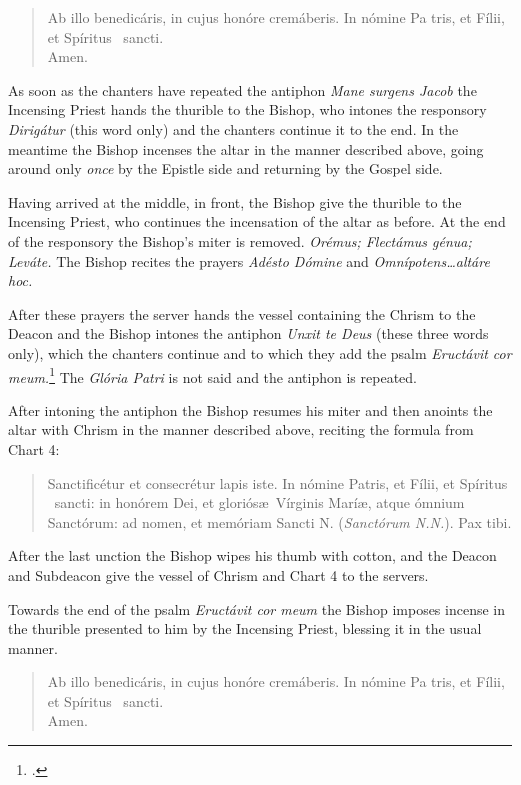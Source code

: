 \documentclass[letterpaper]{report}
\newcommand\blessincense{
\begin{quote}
   Ab illo benedicáris, in cujus honóre cremáberis. In nómine Pa\cross
    tris, et Fí\cross lii, et Spíritus \cross\ sancti. \\ \rbar Amen.
\end{quote}
}
\begin{document}
{    \blessincense

    As soon as the chanters have repeated the antiphon \textit{Mane surgens
    Jacob} the Incensing Priest hands the thurible to the Bishop, who intones
    the responsory \textit{Dirig\'atur} (this word only) and the chanters
    continue it to the end. In the meantime the Bishop incenses the altar in
    the manner described above, going around only \textit{once} by the Epistle
    side and returning by the Gospel side.

    \rubric Having arrived at the middle, in front, the Bishop give the
    thurible to the Incensing Priest, who continues the incensation of the
    altar as before. At the end of the responsory the Bishop's miter is
    removed. \textit{Orémus; Flectámus génua; Leváte.} The Bishop recites the
    prayers \textit{Adésto Dómine} and \textit{Omnípotens\dots altáre hoc.}

    \rubric After these prayers the server hands the vessel containing the
    Chrism to the Deacon and the Bishop intones the antiphon \textit{Unxit te
    Deus} (these three words only), which the chanters continue and to which
    they add the psalm \textit{Eructávit cor meum.}\footcite[The antiphon
    \textit{Unxit te Deus} may be repested after each verse of this
    psalm.][footnote 1, p. 104.]{consecranda} The \textit{Gl\'oria Patri} is not
    said and the antiphon is repeated.

    After intoning the antiphon the Bishop resumes his miter and then anoints
    the altar with Chrism in the manner described above, reciting the formula
    from Chart 4:

    \begin{quote}
        Sancti\cross ficétur et conse\cross crétur lapis iste. In nómine
        Pa\cross tris, et Fí\cross lii, et Spíritus \cross\ sancti: in honórem
        Dei, et gloriós\ae\ Vírginis Marí\ae, atque ómnium Sanctórum: ad nomen,
        et memóriam Sancti N. (\textit{Sanctórum N.N.}). Pax tibi.
    \end{quote}

    After the last unction the Bishop wipes his thumb with cotton, and the
    Deacon and Subdeacon give the vessel of Chrism and Chart 4 to the servers.

    \rubric Towards the end of the psalm \textit{Eruct\'avit cor meum} the Bishop
    imposes incense in the thurible presented to him by the Incensing Priest,
    blessing it in the usual manner. 

    \blessincense

}
\end{document}

